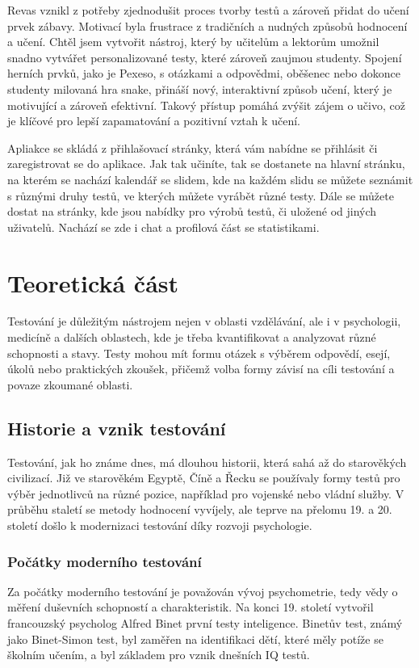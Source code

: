 \documentclass[12pt, a4paper, twoside, openright]{report}
\begin{document}
Revas vznikl z potřeby zjednodušit proces tvorby testů a zároveň přidat do učení prvek zábavy. Motivací byla frustrace z tradičních a nudných způsobů hodnocení a učení. Chtěl jsem vytvořit nástroj, který by učitelům a lektorům umožnil snadno vytvářet personalizované testy, které zároveň zaujmou studenty. Spojení herních prvků, jako je Pexeso, s otázkami a odpovědmi, oběšenec nebo dokonce studenty milovaná hra snake, přináší nový, interaktivní způsob učení, který je motivující a zároveň efektivní. Takový přístup pomáhá zvýšit zájem o učivo, což je klíčové pro lepší zapamatování a pozitivní vztah k učení.

Apliakce se skládá z přihlašovací stránky, která vám nabídne se přihlásit či zaregistrovat se do aplikace. Jak tak učiníte, tak se dostanete na hlavní stránku, na kterém se nachází kalendář se slidem, kde na každém slidu se můžete seznámit s různými druhy testů, ve kterých můžete vyrábět různé testy. Dále se můžete dostat na stránky, kde jsou nabídky pro výrobů testů, či uložené od jiných uživatelů. Nachází se zde i chat a profilová část se statistikami.



\chapter{Teoretická část}
	Testování je důležitým nástrojem nejen v oblasti vzdělávání, ale i v psychologii, medicíně a dalších oblastech, kde je třeba kvantifikovat a analyzovat různé schopnosti a stavy. Testy mohou mít formu otázek s výběrem odpovědí, esejí, úkolů nebo praktických zkoušek, přičemž volba formy závisí na cíli testování a povaze zkoumané oblasti.

\section{Historie a vznik testování}
Testování, jak ho známe dnes, má dlouhou historii, která sahá až do starověkých civilizací. Již ve starověkém Egyptě, Číně a Řecku se používaly formy testů pro výběr jednotlivců na různé pozice, například pro vojenské nebo vládní služby. V průběhu staletí se metody hodnocení vyvíjely, ale teprve na přelomu 19. a 20. století došlo k modernizaci testování díky rozvoji psychologie.

\subsection{Počátky moderního testování}
Za počátky moderního testování je považován vývoj psychometrie, tedy vědy o měření duševních schopností a charakteristik. Na konci 19. století vytvořil francouzský psycholog Alfred Binet první testy inteligence. Binetův test, známý jako Binet-Simon test, byl zaměřen na identifikaci dětí, které měly potíže se školním učením, a byl základem pro vznik dnešních IQ testů.
\end{document}

